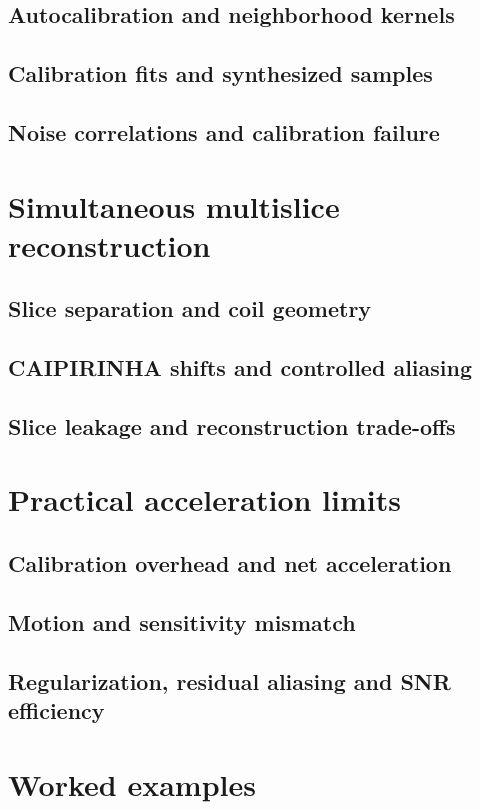 \subsection{Autocalibration and neighborhood kernels}
\subsection{Calibration fits and synthesized samples}
\subsection{Noise correlations and calibration failure}

\section{Simultaneous multislice reconstruction}
\label{sec:14:simultaneous-multislice-reconstruction}
\subsection{Slice separation and coil geometry}
\subsection{CAIPIRINHA shifts and controlled aliasing}
\subsection{Slice leakage and reconstruction trade-offs}

\section{Practical acceleration limits}
\label{sec:14:practical-acceleration-limits}
\subsection{Calibration overhead and net acceleration}
\subsection{Motion and sensitivity mismatch}
\subsection{Regularization, residual aliasing and SNR efficiency}

\section{Worked examples}
\label{sec:14:worked-examples}
